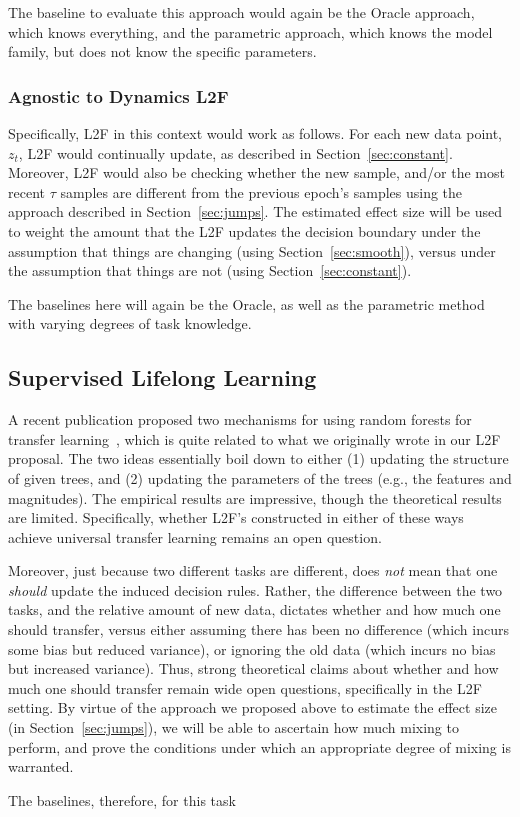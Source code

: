 \documentclass{article}
\begin{document}
The baseline to evaluate this approach would again be the Oracle approach, which knows everything, and the parametric approach, which knows the model family, but does not know the specific parameters. 

\subsubsection{Agnostic to Dynamics L2F}


Specifically, L2F in this context would work as follows.  For each new data point, $z_t$, L2F would continually update, as described in Section~\ref{sec:constant}.  Moreover, L2F would also be checking whether the new sample, and/or the most recent $\tau$ samples are different from the previous epoch's samples using the approach described in Section~\ref{sec:jumps}.  The estimated effect size will be used to weight the amount that the L2F updates the decision boundary under the assumption that things are changing (using Section~\ref{sec:smooth}), versus under the assumption that things are not (using Section~\ref{sec:constant}).  

The baselines here will again be the Oracle, as well as the parametric method with varying degrees of task knowledge. 


\subsection{Supervised Lifelong Learning}

A recent publication proposed two mechanisms for using random forests for transfer learning~\cite{Segev2016}, which is quite related to what we originally wrote in our L2F proposal. The two ideas essentially boil down to either (1) updating the structure of given trees, and (2) updating the parameters of the trees (e.g., the features and magnitudes).  The empirical results are impressive, though the theoretical results are limited.  Specifically, whether L2F's constructed in either of these ways achieve universal transfer learning remains an open question.  

Moreover, just because two different tasks are different, does \emph{not} mean that one \emph{should} update the induced decision rules.  Rather, the difference between the two tasks, and the relative amount of new data, dictates whether and how much one should transfer, versus either assuming there has been no difference (which incurs some bias but reduced variance), or ignoring the old data (which incurs no bias but increased variance).  Thus, strong theoretical claims about whether and how much one should transfer remain wide open questions, specifically in the L2F setting.  By virtue of the approach we proposed above to estimate the effect size (in Section~\ref{sec:jumps}), we will be able to ascertain how much mixing to perform, and prove the conditions under which an appropriate degree of mixing is warranted. 

The baselines, therefore, for this task 
\end{document}
